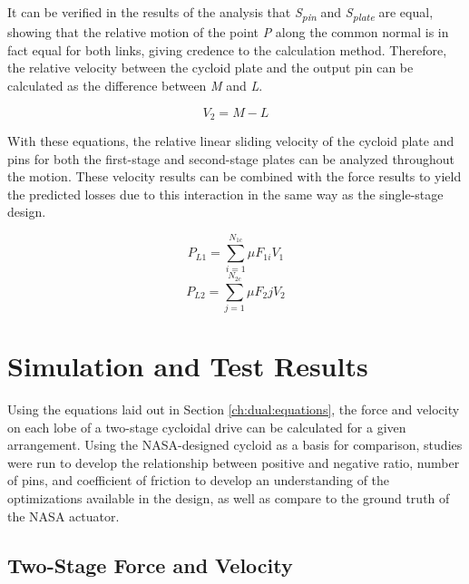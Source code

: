 It can be verified in the results of the analysis that \textit{S\textsubscript{pin}} and \textit{S\textsubscript{plate}} are equal, showing that the relative motion of the point \textit{P} along the common normal is in fact equal for both links, giving credence to the calculation method. Therefore, the relative velocity between the cycloid plate and the output pin can be calculated as the difference between \textit{M} and \textit{L}.

\begin{equation}
V_{2} = M - L
\end{equation}

With these equations, the relative linear sliding velocity of the cycloid plate and pins for both the first-stage and second-stage plates can be analyzed throughout the motion. These velocity results can be combined with the force results to yield the predicted losses due to this interaction in the same way as the single-stage design.

\begin{equation} \label{eq:dual_power_loss_1}
P_{L1} = \sum_{i=1}^{N_{1c}}\mu F_{1i} V_1
\end{equation}
\begin{equation} \label{eq:dual_power_loss_2}
P_{L2} = \sum_{j=1}^{N_{2c}}\mu F_2j V_2
\end{equation}


\section{Simulation and Test Results} \label{ch:dual:test_results}

Using the equations laid out in Section \ref{ch:dual:equations}, the force and velocity on each lobe of a two-stage cycloidal drive can be calculated for a given arrangement. Using the NASA-designed cycloid as a basis for comparison, studies were run to develop the relationship between positive and negative ratio, number of pins, and coefficient of friction to develop an understanding of the optimizations available in the design, as well as compare to the ground truth of the NASA actuator. 

\subsection{Two-Stage Force and Velocity}\label{ch:dual:test_results:force_vel}

